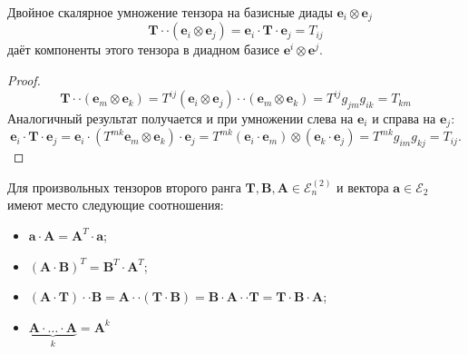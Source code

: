 \begin{utv}
	Двойное скалярное умножение тензора на базисные диады $\mathbf{e}_i\otimes\mathbf{e}_j$
\begin{equation*}
	\mathbf{T}\cdot\cdot\left(\mathbf{e}_i\otimes\mathbf{e}_j\right)=\mathbf{e}_i\cdot\mathbf{T}\cdot\mathbf{e}_j = T_{ij}
\end{equation*}
даёт компоненты этого тензора в диадном базисе $\mathbf{e}^i\otimes\mathbf{e}^j$.
\begin{proof}
	\begin{equation*}
		\mathbf{T}\cdot\cdot\left(\mathbf{e}_m\otimes\mathbf{e}_k\right)= T^{ij}\left(\mathbf{e}_i\otimes\mathbf{e}_j\right)\cdot\cdot\left(\mathbf{e}_m\otimes\mathbf{e}_k\right)=T^{ij}g_{jm}g_{ik}=T_{km}
	\end{equation*}
	Аналогичный результат получается и при умножении слева на $\mathbf{e}_i$ и справа на $\mathbf{e}_j$:
	\begin{equation*}
		\mathbf{e}_i\cdot\mathbf{T}\cdot\mathbf{e}_j = \mathbf{e}_i\cdot\left(T^{mk}\mathbf{e}_m\otimes\mathbf{e}_k\right)\cdot\mathbf{e}_j=
		T^{mk}\left(\mathbf{e}_i\cdot\mathbf{e}_m\right)\otimes\left(\mathbf{e}_k\cdot\mathbf{e}_j\right)=
		T^{mk}g_{im}g_{kj}=T_{ij}.
	\end{equation*}
\end{proof}
\end{utv}
\begin{utv}
	Для произвольных тензоров второго ранга $\mathbf{T},\mathbf{B},\mathbf{A}\in\mathcal{E}_n^{(2)}$ и вектора $\mathbf{a}\in\mathcal{E}_2$ имеют место следующие соотношения:
	\begin{itemize}
		\item $\mathbf{a}\cdot\mathbf{A}=\mathbf{A}^T\cdot\mathbf{a}$;
		\item $\left(\mathbf{A}\cdot\mathbf{B}\right)^T=\mathbf{B}^T\cdot\mathbf{A}^T$;
		\item $\left(\mathbf{A}\cdot\mathbf{T}\right)\cdot\cdot\mathbf{B}=\mathbf{A}\cdot\cdot\left(\mathbf{T}\cdot\mathbf{B}\right)=\mathbf{B}\cdot\mathbf{A}\cdot\cdot\mathbf{T}=\mathbf{T}\cdot\mathbf{B}\cdot\mathbf{A}$;
		\item $\underbrace{\mathbf{A}\cdot\ldots\cdot\mathbf{A}}_{k}=\mathbf{A}^k$
	\end{itemize}
\end{utv}

